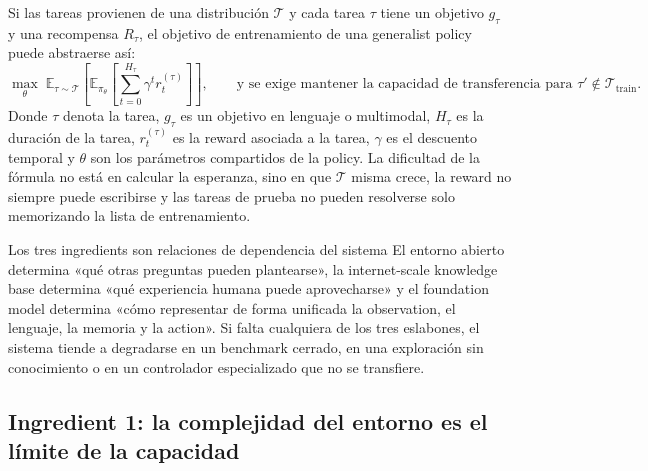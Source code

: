 Si las tareas provienen de una distribución $\mathcal{T}$ y cada tarea $\tau$ tiene un objetivo $g_\tau$ y una recompensa $R_\tau$, el objetivo de entrenamiento de una generalist policy puede abstraerse así:
\[
\max_\theta\;\mathbb{E}_{\tau\sim\mathcal{T}}\left[\mathbb{E}_{\pi_\theta}\left[\sum_{t=0}^{H_\tau}\gamma^t r_t^{(\tau)}\right]\right],
\qquad \text{y se exige mantener la capacidad de transferencia para }\tau'\notin\mathcal{T}_{\text{train}}\text{.}
\]
Donde $\tau$ denota la tarea, $g_\tau$ es un objetivo en lenguaje o multimodal, $H_\tau$ es la duración de la tarea, $r_t^{(\tau)}$ es la reward asociada a la tarea, $\gamma$ es el descuento temporal y $\theta$ son los parámetros compartidos de la policy. La dificultad de la fórmula no está en calcular la esperanza, sino en que $\mathcal{T}$ misma crece, la reward no siempre puede escribirse y las tareas de prueba no pueden resolverse solo memorizando la lista de entrenamiento.


\begin{importantbox}{Los tres ingredients son relaciones de dependencia del sistema}
El entorno abierto determina «qué otras preguntas pueden plantearse», la internet-scale knowledge base determina «qué experiencia humana puede aprovecharse» y el foundation model determina «cómo representar de forma unificada la observation, el lenguaje, la memoria y la action». Si falta cualquiera de los tres eslabones, el sistema tiende a degradarse en un benchmark cerrado, en una exploración sin conocimiento o en un controlador especializado que no se transfiere.
\end{importantbox}


\subsection{Ingredient 1: la complejidad del entorno es el límite de la capacidad}

